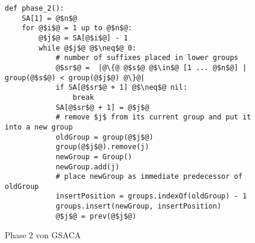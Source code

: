 \begin{figure}
\begin{verbatim}
def phase_2():
	SA[1] = @$n$@ 
	for @$i$@ = 1 up to @$n$@:
		@$j$@ = SA[@$i$@] - 1 
		while @$j$@ @$\neq$@ 0:
			# number of suffixes placed in lower groups
			@$sr$@ =  |@\{@ @$s$@ @$\in$@ [1 ... @$n$@] | group(@$s$@) < group(@$j$@) @\}@|
			if SA[@$sr$@ + 1] @$\neq$@ nil: 
				break
			SA[@$sr$@ + 1] = @$j$@
			# remove $j$ from its current group and put it into a new group
			oldGroup = group(@$j$@)
			group(@$j$@).remove(j)
			newGroup = Group()
			newGroup.add(j)
			# place newGroup as immediate predecessor of oldGroup
			insertPosition = groups.indexOf(oldGroup) - 1
			groups.insert(newGroup, insertPosition)
			@$j$@ = prev(@$j$@)
\end{verbatim}
\caption[Phase 2 von GSACA]{Phase 2 von GSACA}
\label{saca:3:code_2}
\end{figure}